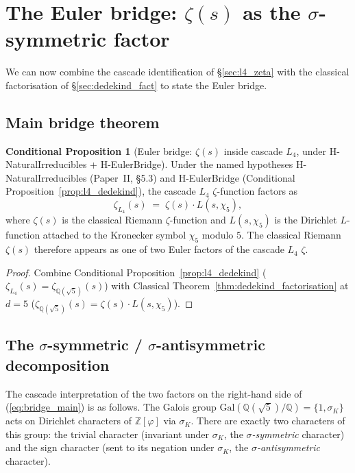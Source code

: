 \documentclass[11pt,a4paper]{article}
\theoremstyle{definition}
\newtheorem{conditional}[theorem]{Conditional Proposition}
\theoremstyle{remark}
\begin{document}
\section{The Euler bridge: $\zeta(s)$ as the $\sigma$-symmetric factor}\label{sec:euler_bridge}

We can now combine the cascade identification of \S\ref{sec:l4_zeta}
with the classical factorisation of \S\ref{sec:dedekind_fact} to state
the Euler bridge.

\subsection{Main bridge theorem}

\begin{conditional}[Euler bridge: $\zeta(s)$ inside cascade $L_4$, under H-NaturalIrreducibles + H-EulerBridge]\label{thm:euler_bridge}
Under the named hypotheses H-NaturalIrreducibles (Paper~II, \S 5.3) and
H-EulerBridge (Conditional Proposition~\ref{prop:l4_dedekind}), the
cascade $L_4$ $\zeta$-function factors as
\begin{equation}\label{eq:bridge_main}
  \zeta_{L_4}(s) \;=\; \zeta(s) \cdot L(s, \chi_5),
\end{equation}
where $\zeta(s)$ is the classical Riemann $\zeta$-function and
$L(s, \chi_5)$ is the Dirichlet $L$-function attached to the
Kronecker symbol $\chi_5$ modulo $5$. The classical Riemann $\zeta(s)$
therefore appears as one of two Euler factors of the cascade $L_4$
$\zeta$.
\end{conditional}

\begin{proof}
Combine Conditional Proposition~\ref{prop:l4_dedekind}
($\zeta_{L_4}(s) = \zeta_{\mathbb{Q}(\sqrt{5})}(s)$) with Classical
Theorem~\ref{thm:dedekind_factorisation} at $d = 5$
($\zeta_{\mathbb{Q}(\sqrt{5})}(s) = \zeta(s) \cdot L(s, \chi_5)$).
\end{proof}

\subsection{The $\sigma$-symmetric / $\sigma$-antisymmetric decomposition}

The cascade interpretation of the two factors on the right-hand side
of (\ref{eq:bridge_main}) is as follows. The Galois group
$\mathrm{Gal}(\mathbb{Q}(\sqrt{5})/\mathbb{Q}) = \{1, \sigma_K\}$ acts
on Dirichlet characters of $\mathbb{Z}[\varphi]$ via $\sigma_K$. There
are exactly two characters of this group: the trivial character
(invariant under $\sigma_K$, the \emph{$\sigma$-symmetric} character)
and the sign character (sent to its negation under $\sigma_K$, the
\emph{$\sigma$-antisymmetric} character).
\end{document}
